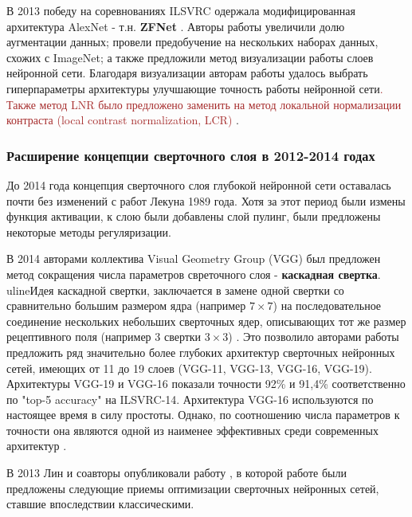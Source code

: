 \documentclass[12pt]{article}
\begin{document}
\begin{sloppypar}
В 2013 победу на соревнованиях ILSVRC одержала модифицированная архитектура AlexNet - т.н. \textbf{ZFNet} \cite{zeiler2014visualizing}. Авторы работы \cite{zeiler2014visualizing} увеличили долю аугментации данных; провели предобучение на нескольких наборах данных, схожих с ImageNet; а также предложили метод визуализации работы слоев нейронной сети. Благодаря визуализации авторам работы  \cite{zeiler2014visualizing} удалось выбрать гиперпараметры архитектуры улучшающие точность работы нейронной сети\textcolor{brown}{. Также метод LNR было предложено заменить на метод локальной нормализации контраста (local contrast normalization, LCR)} \cite{zeiler2014visualizing}.

\subsubsection{Расширение концепции сверточного слоя в 2012-2014 годах}
До 2014 года концепция сверточного слоя глубокой нейронной сети оставалась почти без изменений с работ Лекуна 1989 года. Хотя за этот период были измены функция активации, к слою были добавлены слой пулинг, были предложены некоторые методы регуляризации. 

В 2014 авторами коллектива  Visual Geometry Group (VGG) был предложен метод сокращения числа параметров свреточного слоя - \textbf{каскадная свертка}. uline{Идея каскадной свертки, заключается в замене одной свертки со сравнительно большим размером ядра (например $7\times 7$) на последовательное соединение нескольких небольших сверточных ядер, описывающих тот же размер рецептивного поля (например 3 свертки $3\times 3$)} \cite{simonyan2014very}. Это позволило авторами работы \cite{simonyan2014very} предложить ряд значительно более глубоких архитектур сверточных нейронных сетей, имеющих от 11 до 19 слоев (VGG-11, VGG-13, VGG-16, VGG-19). Архитектуры VGG-19 и VGG-16 показали точности 92\% и 91,4\% соответственно по "top-5 accuracy" на ILSVRC-14.  Архитектура VGG-16 используются по настоящее время в силу простоты. Однако, по соотношению числа параметров к точности она являются одной из наименее эффективных среди современных архитектур \cite{paperswithcodeImagenet}. 


В 2013 Лин и соавторы опубликовали работу \cite{lin2013network}, в которой работе были предложены следующие приемы оптимизации сверточных нейронных сетей, ставшие впоследствии классическими.
\begin{itemize}
    

\end{itemize}
\end{sloppypar}
\end{document}
